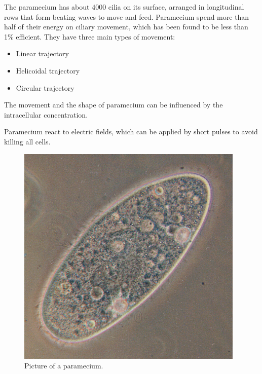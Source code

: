 \noindent
\begin{minipage}{0.56\textwidth}

\indent The paramecium has about $4000$ cilia on its surface, arranged in longitudinal rows that form beating waves to move and feed. Paramecium spend more than half of their energy on ciliary movement, which has been found to be less than 1\% efficient. They have three main types of movement: 

\begin{itemize}
    \item Linear trajectory
    \item Helicoidal trajectory
    \item Circular trajectory
\end{itemize}

The movement and the shape of paramecium can be influenced by the intracellular  concentration.

Paramecium react to electric fields, which can be applied by short pulses to avoid killing all cells. 

\end{minipage}
\hfill
\begin{minipage}{0.42\textwidth}
    \begin{figure}[H]
    \centering 
    \captionsetup{width=0.98\linewidth, justification=centering}
    \includegraphics[width=0.97\textwidth]{Figures/Paramecium.jpg}
    \caption{Picture of a paramecium. \cite{wikipedia}}
    \label{fig:paramecium}
    \end{figure}
\end{minipage}

